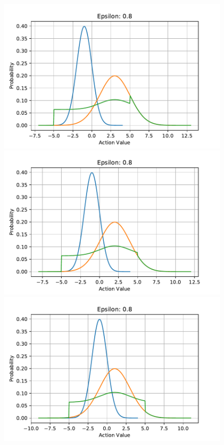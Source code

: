 \documentclass{article}
\begin{document}
\begin{figure}[htbp]
	\centering
	\includegraphics[scale=0.4]{img/noise28.pdf}
	\includegraphics[scale=0.4]{img/noise38.pdf}
	\includegraphics[scale=0.4]{img/noise48.pdf}

\end{figure}
\end{document}

